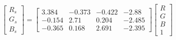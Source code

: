 \begin{equation}
\begin{bmatrix}
  R_s \\ G_s \\ B_s 
\end{bmatrix}=
\left[\begin{matrix}3.384 & -0.373 & -0.422 & -2.88\\ 
-0.154 & 2.71 & 0.204 & -2.485\\ 
-0.365 & 0.168 & 2.691 & -2.395\end{matrix}\right]
\begin{bmatrix}
  R \\ G \\ B \\ 1 
\end{bmatrix}
\end{equation}
